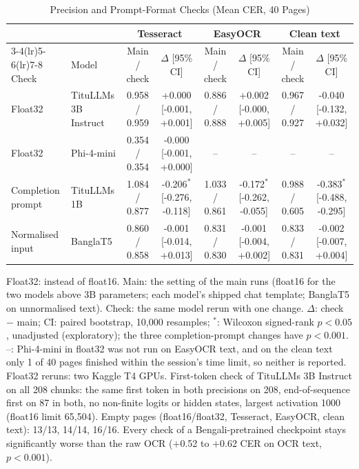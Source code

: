 \begin{table}[t]
\centering
\caption{Precision and Prompt-Format Checks (Mean CER, 40 Pages)}
\label{tab:checks}
\setlength{\tabcolsep}{3pt}
\scriptsize
\begin{tabular}{llcccccc}
\toprule
 & & \multicolumn{2}{c}{Tesseract} & \multicolumn{2}{c}{EasyOCR} & \multicolumn{2}{c}{Clean text} \\
\cmidrule(lr){3-4}\cmidrule(lr){5-6}\cmidrule(lr){7-8}
Check & Model & Main / check & $\Delta$ [95\% CI] & Main / check & $\Delta$ [95\% CI] & Main / check & $\Delta$ [95\% CI] \\
\midrule
Float32 & TituLLMs 3B Instruct & 0.958 / 0.959 & +0.000 [-0.001, +0.001] & 0.886 / 0.888 & +0.002 [-0.000, +0.005] & 0.967 / 0.927 & -0.040 [-0.132, +0.032] \\
Float32 & Phi-4-mini & 0.354 / 0.354 & -0.000 [-0.001, +0.000] & -- & -- & -- & -- \\
Completion prompt & TituLLMs 1B & 1.084 / 0.877 & -0.206$^{*}$ [-0.276, -0.118] & 1.033 / 0.861 & -0.172$^{*}$ [-0.262, -0.055] & 0.988 / 0.605 & -0.383$^{*}$ [-0.488, -0.295] \\
Normalised input & BanglaT5 & 0.860 / 0.858 & -0.001 [-0.014, +0.013] & 0.831 / 0.830 & -0.001 [-0.004, +0.002] & 0.833 / 0.831 & -0.002 [-0.007, +0.004] \\
\bottomrule
\end{tabular}
\par\smallskip
\begin{minipage}{\linewidth}\footnotesize Float32: instead of float16. Main: the setting of the main runs (float16 for the two models above 3B parameters; each model's shipped chat template; BanglaT5 on unnormalised text). Check: the same model rerun with one change. $\Delta$: check $-$ main; CI: paired bootstrap, 10{,}000 resamples; $^{*}$: Wilcoxon signed-rank $p<0.05$, unadjusted (exploratory); the three completion-prompt changes have $p<0.001$. --: Phi-4-mini in float32 was not run on EasyOCR text, and on the clean text only 1 of 40 pages finished within the session's time limit, so neither is reported. Float32 reruns: two Kaggle T4 GPUs. First-token check of TituLLMs 3B Instruct on all 208 chunks: the same first token in both precisions on 208, end-of-sequence first on 87 in both, no non-finite logits or hidden states, largest activation 1000 (float16 limit 65{,}504). Empty pages (float16/float32, Tesseract, EasyOCR, clean text): 13/13, 14/14, 16/16. Every check of a Bengali-pretrained checkpoint stays significantly worse than the raw OCR ($+$0.52 to $+$0.62 CER on OCR text, $p<0.001$).\end{minipage}
\end{table}
